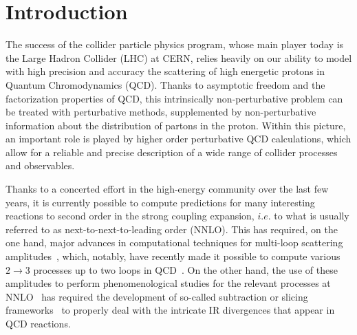
\section{Introduction}


The success of the collider particle physics program, whose main
player today is the Large Hadron Collider (LHC) at CERN, relies
heavily on our ability to model with high precision and accuracy the
scattering of high energetic protons in Quantum Chromodynamics (QCD).
Thanks to asymptotic freedom and the factorization properties of QCD,
this intrinsically non-perturbative problem can be treated with
perturbative methods, supplemented by non-perturbative information about
the distribution of partons in the proton. Within this picture, an important
role is played by higher order perturbative QCD calculations, which allow
for a reliable and precise description of a wide range of collider processes
and observables.

Thanks to a concerted effort in the high-energy community over the
last few years, it is currently possible to compute predictions for
many interesting reactions to second order in the strong coupling
expansion, $i.e.$ to what is usually referred to as
next-to-next-to-leading order (NNLO). 
This has required, on the one hand, 
major advances in computational techniques
for multi-loop scattering amplitudes~\cite{Tkachov:1981wb,Chetyrkin:1981qh,Hodges:2009hk,Gluza:2010ws,Ita:2015tya,Larsen:2015ped,Bohm:2017qme,Badger:2016uuq,vonManteuffel:2014ixa,Peraro:2016wsq,Peraro:2019svx,Guan:2019bcx,Pak:2011xt,Abreu:2019odu,Heller:2021qkz,Kotikov:1990kg,Bern:1993kr,Remiddi:1997ny,Gehrmann:1999as,Papadopoulos:2014lla,Dixon:1996wi,Henn:2013pwa,Primo:2016ebd,Goncharov,Remiddi:1999ew,Goncharov:2001iea,Goncharov:2010jf,Brown:2008um,Ablinger:2013cf,Panzer:2014caa,Duhr:2011zq,Duhr:2012fh,Duhr:2019tlz},
which, notably, have recently made it possible to compute
various $2 \to 3$ processes up to two loops in QCD~\cite{Badger:2017jhb,Abreu:2017hqn,Abreu:2018aqd,Abreu:2018zmy,Abreu:2018jgq,Abreu:2019rpt,Abreu:2020cwb,Chicherin:2018yne,Chicherin:2019xeg,Chawdhry:2020for,DeLaurentis:2020qle,Chawdhry:2018awn,Abreu:2020xvt,Agarwal:2021grm,Badger:2021nhg,Abreu:2021fuk,Agarwal:2021vdh,Chawdhry:2021mkw,Badger:2021imn,Gehrmann:2015bfy,Papadopoulos:2015jft,Gehrmann:2018yef,Chicherin:2018mue,Chicherin:2020oor}.
On the other hand, the use of these amplitudes to perform phenomenological
studies for the relevant processes at NNLO~\cite{Chawdhry:2019bji,Kallweit:2020gcp,Chawdhry:2021hkp,Czakon:2021mjy} has required the
development of so-called subtraction or slicing frameworks~\cite{GehrmannDeRidder:2005cm,Czakon:2010td,Caola:2017dug,Magnea:2018hab,Herzog:2018ily,DelDuca:2016ily,Cacciari:2015jma,Catani:2007vq,Gaunt:2015pea,Boughezal:2015dva}
to properly deal with the intricate IR divergences that appear in QCD reactions. 

